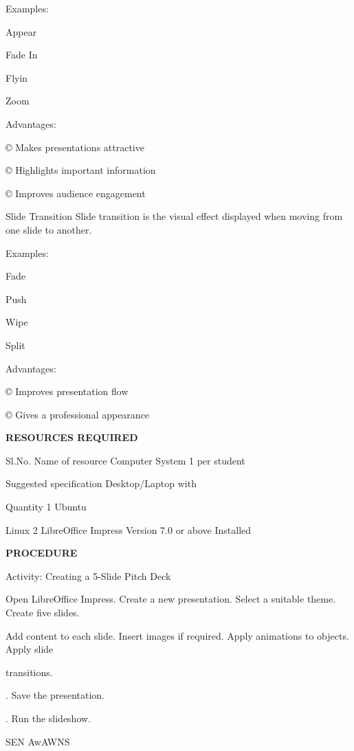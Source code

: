 \documentclass[10pt,a4paper]{article}
\begin{document}
\noindent Examples:\par
\noindent Appear\par
\clearpage
\noindent Fade In\par
\noindent Flyin\par
\noindent Zoom\par

\noindent Advantages:\par
\noindent © Makes presentations attractive\par
\noindent © Highlights important information\par
\noindent © Improves audience engagement\par
\noindent Slide Transition Slide transition is the visual effect displayed when moving from one slide to another.\par
\noindent Examples:\par
\noindent Fade\par
\noindent Push\par
\noindent Wipe\par
\noindent Split\par

\noindent Advantages:\par
\noindent © Improves presentation flow\par
\noindent © Gives a professional appearance\par

\medskip\noindent\textbf{RESOURCES REQUIRED}\par
\noindent Sl.No.                      Name of resource          Computer System            1 per student\par
\noindent Suggested specification   Desktop/Laptop with\par
\noindent Quantity 1                Ubuntu\par

\noindent Linux 2                                               LibreOffice Impress Version 7.0 or above Installed\par

\medskip\noindent\textbf{PROCEDURE}\par
\noindent Activity: Creating a 5-Slide Pitch Deck\par
\noindent Open LibreOffice Impress. Create a new presentation. Select a suitable theme. Create five slides.\par
\noindent Add content to each slide. Insert images if required. Apply animations to objects. Apply slide\par
\noindent transitions.\par
{}. Save the presentation.\par
{}. Run the slideshow.\par
\noindent SEN AwAWNS\par
\end{document}
